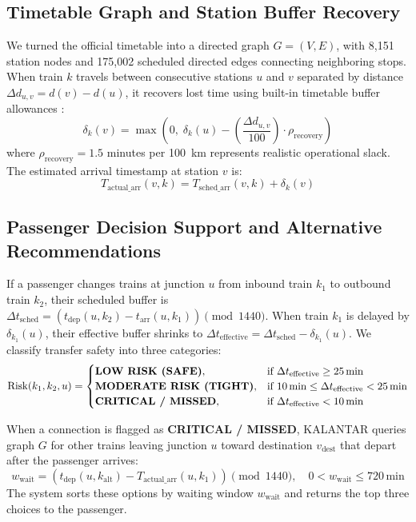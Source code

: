 \documentclass[11pt,a4paper]{article}
\begin{document}
\subsection{Timetable Graph and Station Buffer Recovery}
We turned the official timetable into a directed graph $G = (V, E)$, with 8,151 station nodes and 175,002 scheduled directed edges connecting neighboring stops. When train $k$ travels between consecutive stations $u$ and $v$ separated by distance $\Delta d_{u,v} = d(v) - d(u)$, it recovers lost time using built-in timetable buffer allowances \cite{pachl2002railway}:
\begin{equation}
\delta_k(v) = \max\left(0, \; \delta_k(u) - \left( \frac{\Delta d_{u,v}}{100} \right) \cdot \rho_{\mathrm{recovery}} \right)
\end{equation}
where $\rho_{\mathrm{recovery}} = 1.5$ minutes per 100~km represents realistic operational slack. The estimated arrival timestamp at station $v$ is:
\begin{equation}
T_{\mathrm{actual\_arr}}(v, k) = T_{\mathrm{sched\_arr}}(v, k) + \delta_k(v)
\end{equation}

\subsection{Passenger Decision Support and Alternative Recommendations}
If a passenger changes trains at junction $u$ from inbound train $k_1$ to outbound train $k_2$, their scheduled buffer is $\Delta t_{\mathrm{sched}} = (t_{\mathrm{dep}}(u, k_2) - t_{\mathrm{arr}}(u, k_1)) \pmod{1440}$. When train $k_1$ is delayed by $\delta_{k_1}(u)$, their effective buffer shrinks to $\Delta t_{\mathrm{effective}} = \Delta t_{\mathrm{sched}} - \delta_{k_1}(u)$. We classify transfer safety into three categories:
\begin{equation}
\mathrm{Risk}(k_1, k_2, u) = 
\begin{cases}
\text{\textbf{LOW RISK (SAFE)}}, & \text{if } \Delta t_{\mathrm{effective}} \ge 25\,\mathrm{min} \\
\text{\textbf{MODERATE RISK (TIGHT)}}, & \text{if } 10\,\mathrm{min} \le \Delta t_{\mathrm{effective}} < 25\,\mathrm{min} \\
\text{\textbf{CRITICAL / MISSED}}, & \text{if } \Delta t_{\mathrm{effective}} < 10\,\mathrm{min}
\end{cases}
\end{equation}

When a connection is flagged as \textbf{CRITICAL / MISSED}, KALANTAR queries graph $G$ for other trains leaving junction $u$ toward destination $v_{\mathrm{dest}}$ that depart after the passenger arrives:
\begin{equation}
w_{\mathrm{wait}} = \left( t_{\mathrm{dep}}(u, k_{\mathrm{alt}}) - T_{\mathrm{actual\_arr}}(u, k_1) \right) \pmod{1440}, \quad 0 < w_{\mathrm{wait}} \le 720\,\mathrm{min}
\end{equation}
The system sorts these options by waiting window $w_{\mathrm{wait}}$ and returns the top three choices to the passenger.
\end{document}
